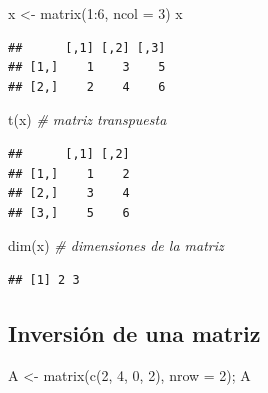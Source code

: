\documentclass[
]{book}
\newenvironment{Shaded}{\begin{snugshade}}{\end{snugshade}}
\newcommand{\AttributeTok}[1]{\textcolor[rgb]{0.77,0.63,0.00}{#1}}
\newcommand{\CommentTok}[1]{\textcolor[rgb]{0.56,0.35,0.01}{\textit{#1}}}
\newcommand{\DecValTok}[1]{\textcolor[rgb]{0.00,0.00,0.81}{#1}}
\newcommand{\FunctionTok}[1]{\textcolor[rgb]{0.00,0.00,0.00}{#1}}
\newcommand{\NormalTok}[1]{#1}
\newcommand{\OtherTok}[1]{\textcolor[rgb]{0.56,0.35,0.01}{#1}}
\newcommand{\SpecialCharTok}[1]{\textcolor[rgb]{0.00,0.00,0.00}{#1}}
\theoremstyle{break}
\begin{document}
\begin{Shaded}
\begin{Highlighting}[]
\NormalTok{x }\OtherTok{\textless{}{-}} \FunctionTok{matrix}\NormalTok{(}\DecValTok{1}\SpecialCharTok{:}\DecValTok{6}\NormalTok{, }\AttributeTok{ncol =} \DecValTok{3}\NormalTok{)}
\NormalTok{x}
\end{Highlighting}
\end{Shaded}

\begin{verbatim}
##      [,1] [,2] [,3]
## [1,]    1    3    5
## [2,]    2    4    6
\end{verbatim}

\begin{Shaded}
\begin{Highlighting}[]
\FunctionTok{t}\NormalTok{(x)  }\CommentTok{\# matriz transpuesta}
\end{Highlighting}
\end{Shaded}

\begin{verbatim}
##      [,1] [,2]
## [1,]    1    2
## [2,]    3    4
## [3,]    5    6
\end{verbatim}

\begin{Shaded}
\begin{Highlighting}[]
\FunctionTok{dim}\NormalTok{(x)  }\CommentTok{\# dimensiones de la matriz}
\end{Highlighting}
\end{Shaded}

\begin{verbatim}
## [1] 2 3
\end{verbatim}

\hypertarget{inversiuxf3n-de-una-matriz}{%
\subsection{Inversión de una matriz}\label{inversiuxf3n-de-una-matriz}}

\begin{Shaded}
\begin{Highlighting}[]
\NormalTok{A }\OtherTok{\textless{}{-}} \FunctionTok{matrix}\NormalTok{(}\FunctionTok{c}\NormalTok{(}\DecValTok{2}\NormalTok{, }\DecValTok{4}\NormalTok{, }\DecValTok{0}\NormalTok{, }\DecValTok{2}\NormalTok{), }\AttributeTok{nrow =} \DecValTok{2}\NormalTok{); A}
\end{Highlighting}
\end{Shaded}
\end{document}
